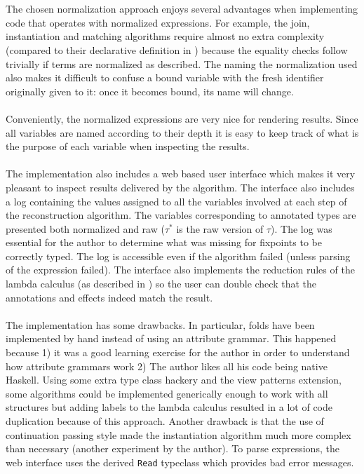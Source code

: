 \documentclass[8pt]{extarticle}
\begin{document}
\\\\
The chosen normalization approach enjoys several advantages when implementing code that operates with normalized expressions. For example, the join, instantiation and matching algorithms require almost no extra complexity (compared to their declarative definition in \cite{analysis}) because the equality checks follow trivially if terms are normalized as described. The naming the normalization used also makes it difficult to confuse a bound variable with the fresh identifier originally given to it: once it becomes bound, its name will change.
\\\\
Conveniently, the normalized expressions are very nice for rendering results. Since all variables are named according to their depth it is easy to keep track of what is the purpose of each variable when inspecting the results. 
\\\\
The implementation also includes a web based user interface which makes it very pleasant to inspect results delivered by the algorithm. The interface also includes a log containing the values assigned to all the variables involved at each step of the reconstruction algorithm. The variables corresponding to annotated types are presented both normalized and raw ($\tau^*$ is the raw version of $\tau$). The log was essential for the author to determine what was missing for fixpoints to be correctly typed. The log is accessible even if the algorithm failed (unless parsing of the expression failed). The interface also implements the reduction rules of the lambda calculus (as described in \cite{analysis}) so the user can double check that the annotations and effects indeed match the result.
\\\\
The implementation has some drawbacks. In particular, folds have been implemented by hand instead of using an attribute grammar. This happened because 1) it was a good learning exercise for the author in order to understand how attribute grammars work 2) The author likes all his code being native Haskell. Using some extra type class hackery and the view patterns extension, some algorithms could be implemented generically enough to work with all structures but adding labels to the lambda calculus resulted in a lot of code duplication because of this approach. Another drawback is that the use of continuation passing style made the instantiation algorithm much more complex than necessary (another experiment by the author). To parse expressions, the web interface uses the derived \verb+Read+ typeclass which provides bad error messages.


\end{document}
